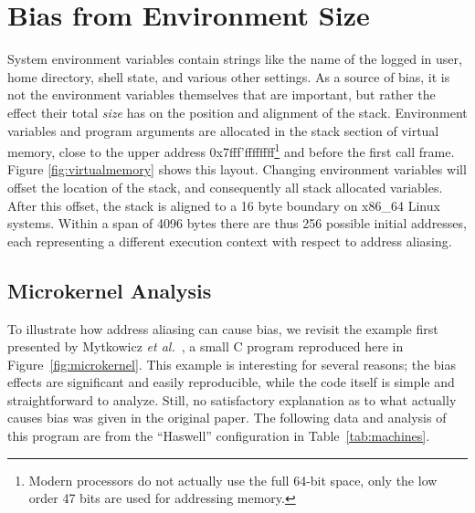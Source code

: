 \documentclass[10pt, conference, compsocconf]{IEEEtran}
\begin{document}
\section{Bias from Environment Size}
\label{sec:environment}
System environment variables contain strings like the name of the logged in user, home directory, shell state, and various other settings.
As a source of bias, it is not the environment variables themselves that are important, but rather the effect their total \emph{size} has on the position and alignment of the stack.
Environment variables and program arguments are allocated in the stack section of virtual memory, close to the upper address 0x7fff'ffffffff\footnote{Modern processors do not actually use the full 64-bit space, only the low order 47 bits are used for addressing memory.} and before the first call frame. Figure \ref{fig:virtualmemory} shows this layout.
Changing environment variables will offset the location of the stack, and consequently all stack allocated variables.
After this offset, the stack is aligned to a 16 byte boundary on x86_64 Linux systems.
Within a span of 4096 bytes there are thus 256 possible initial addresses, each representing a different execution context with respect to address aliasing.

\subsection{Microkernel Analysis}
\label{sec:microkernel}
To illustrate how address aliasing can cause bias, we revisit the example first presented by Mytkowicz \emph{et al.}~\cite{Mytkowicz:2009:WrongData}, a small C program reproduced here in Figure~\ref{fig:microkernel}.
This example is interesting for several reasons; the bias effects are significant and easily reproducible, while the code itself is simple and straightforward to analyze.
Still, no satisfactory explanation as to what actually causes bias was given in the original paper.
The following data and analysis of this program are from the ``Haswell'' configuration in Table~\ref{tab:machines}.
\end{document}
